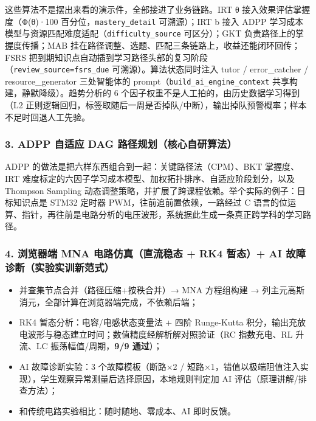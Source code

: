 \documentclass[zihao=-4,a4paper,UTF8,fontset=windows]{ctexart}
\begin{document}
这些算法不是摆出来看的演示件，全部接进了业务链路。IRT θ 接入效果评估掌握度（Φ(θ)·100 百分位，\texttt{mastery\_\allowbreak{}detail} 可溯源）；IRT b 接入 ADPP 学习成本模型与资源匹配难度适配（\texttt{difficulty\_\allowbreak{}source} 可区分）；GKT 负责路径上的掌握度传播；MAB 挂在路径调整、选题、匹配三条链路上，收益还能闭环回传；FSRS 把到期知识点自动插到学习路径头部的复习阶段（\texttt{review\_\allowbreak{}source=fsrs\_\allowbreak{}due} 可溯源）。算法状态同时注入 tutor / error\_catcher / resource\_generator 三处智能体的 prompt（\texttt{build\_\allowbreak{}ai\_\allowbreak{}engine\_\allowbreak{}context} 共享构建，静默降级）。趋势分析的 6 个因子权重不是人工拍的，由历史数据学习得到（L2 正则逻辑回归，标签取随后一周是否掉队/中断），输出掉队预警概率；样本不足时回退人工先验。

\subsubsection{3. ADPP 自适应 DAG 路径规划（核心自研算法）}


ADPP 的做法是把六样东西组合到一起：关键路径法（CPM）、BKT 掌握度、IRT 难度标定的六因子学习成本模型、加权拓扑排序、自适应阶段划分，以及 Thompson Sampling 动态调整策略，并扩展了跨课程依赖。举个实际的例子：目标知识点是 STM32 定时器 PWM，往前追前置依赖，一路经过 C 语言的位运算、指针，再往前是电路分析的电压波形，系统据此生成一条真正跨学科的学习路径。

\subsubsection{4. 浏览器端 MNA 电路仿真（直流稳态 + RK4 暂态）+ AI 故障诊断（实验实训新范式）}
\begin{itemize}[leftmargin=2em,itemsep=0pt,topsep=0pt]
\item 并查集节点合并（路径压缩+按秩合并）→ MNA 方程组构建 → 列主元高斯消元，全部计算在浏览器端完成，不依赖后端；
\end{itemize}
\begin{itemize}[leftmargin=2em,itemsep=0pt,topsep=0pt]
\item RK4 暂态分析：电容/电感状态变量法 + 四阶 Runge-Kutta 积分，输出充放电波形与稳态建立时间；数值精度经解析解对照验证（RC 指数充电、RL 升流、LC 振荡幅值/周期，\textbf{9/9 通过}）；
\end{itemize}
\begin{itemize}[leftmargin=2em,itemsep=0pt,topsep=0pt]
\item AI 故障诊断实验：3 个故障模板（断路×2 / 短路×1，错值以极端阻值注入实现），学生观察异常测量后选择原因，本地规则判定加 AI 评估（原理讲解/排查方法）；
\end{itemize}
\begin{itemize}[leftmargin=2em,itemsep=0pt,topsep=0pt]
\item 和传统电路实验相比：随时随地、零成本、AI 即时反馈。
\end{itemize}
\end{document}
